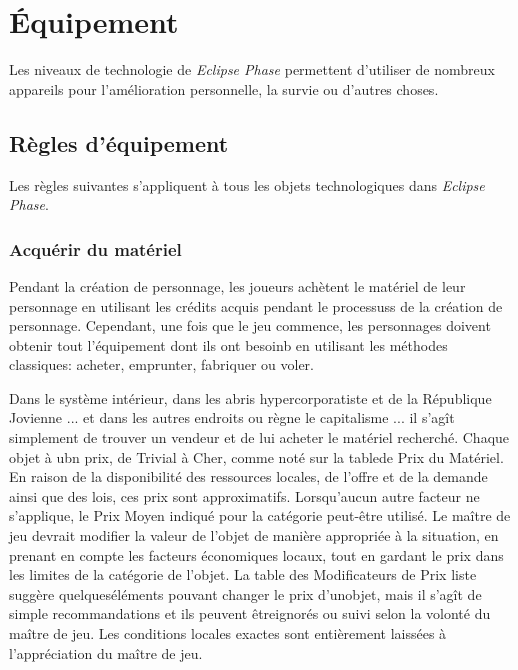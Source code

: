 



\chapter{Équipement} \label{cha:gear} 

Les niveaux de technologie de \emph{Eclipse Phase} permettent d'utiliser de nombreux appareils pour l'amélioration personnelle, la survie ou d'autres choses. 



\section{Règles d'équipement} \label{sec:equipment-rules} 

Les règles suivantes s'appliquent à tous les objets technologiques dans \emph{Eclipse Phase}. 



\subsection{Acquérir du matériel} \label{sec:acquiring-gear} 

Pendant la création de personnage, les joueurs achètent le matériel de leur personnage en utilisant les crédits acquis pendant le processuss de la création de personnage. Cependant, une fois que le jeu commence, les personnages doivent obtenir tout l'équipement dont ils ont besoinb en utilisant les méthodes classiques: acheter, emprunter, fabriquer ou voler. 

Dans le système intérieur, dans les abris hypercorporatiste et de la République Jovienne ... et dans les autres endroits ou règne le capitalisme ... il s'agît simplement de trouver un vendeur et de lui acheter le matériel recherché. Chaque objet à ubn prix, de Trivial à Cher, comme noté sur la tablede Prix du Matériel. En raison de la disponibilité des ressources locales, de l'offre et de la demande ainsi que des lois, ces prix sont approximatifs.  Lorsqu'aucun autre facteur ne s'applique, le Prix Moyen indiqué pour la catégorie peut-être utilisé. Le maître de jeu devrait modifier la valeur de l'objet de manière appropriée à la situation, en prenant en compte les facteurs économiques locaux, tout en gardant le prix dans les limites de la catégorie de l'objet. La table des Modificateurs de Prix liste suggère quelqueséléments pouvant changer le prix d'unobjet, mais il s'agît de simple recommandations et ils peuvent êtreignorés ou suivi selon la volonté du maître de jeu. Les conditions locales exactes sont entièrement laissées à l'appréciation du maître de jeu. 

